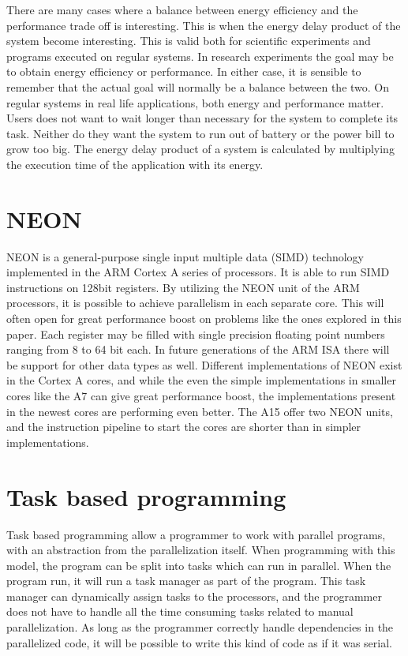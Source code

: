 There are many cases where a balance between energy efficiency and the performance trade off is interesting.
This is when the energy delay product of the system become interesting.
This is valid both for scientific experiments and programs executed on regular systems.
In research experiments the goal may be to obtain energy efficiency or performance.
In either case, it is sensible to remember that the actual goal will normally be a balance between the two.
On regular systems in real life applications, both energy and performance matter.
Users does not want to wait longer than necessary for the system to complete its task.
Neither do they want the system to run out of battery or the power bill to grow too big.
The energy delay product of a system is calculated by multiplying the execution time of the application with its energy.

\section{NEON}
NEON is a general-purpose single input multiple data (SIMD) technology implemented in the ARM Cortex A series of processors.
It is able to run SIMD instructions on 128bit registers.
By utilizing the NEON unit of the ARM processors, it is possible to achieve parallelism in each separate core.
This will often open for great performance boost on problems like the ones explored in this paper.
Each register may be filled with single precision floating point numbers ranging from 8 to 64 bit each.
In future generations of the ARM ISA there will be support for other data types as well.
Different implementations of NEON exist in the Cortex A cores, and while the even the simple implementations in smaller cores like the A7 can give great performance boost, the implementations present in the newest cores are performing even better.
The A15 offer two NEON units, and the instruction pipeline to start the cores are shorter than in simpler implementations.

\section{Task based programming}
Task based programming allow a programmer to work with parallel programs, with an abstraction from the parallelization itself.
When programming with this model, the program can be split into tasks which can run in parallel.
When the program run, it will run a task manager as part of the program.
This task manager can dynamically assign tasks to the processors, and the programmer does not have to handle all the time consuming tasks related to manual parallelization.
As long as the programmer correctly handle dependencies in the parallelized code, it will be possible to write this kind of code as if it was serial.

